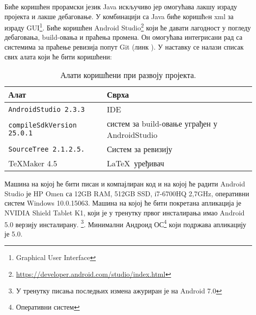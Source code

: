  
Биће коришћен прорамски језик Java искључиво јер омогућава лакшу израду пројекта и лакше дебаговање. У комбинацији са Java биће коришћeн xml за израду GUI\footnote{Graphical User Interface}. Биће коришћен  Android Studio\footnote{\url{https://developer.android.com/studio/index.html}} који ће давати лагодност у погледу дебаговања, build-овања и праћења промена. Он омогућава интегрисани рад са системима за праћење ревизија попут Git (линк \cite{BitBucket}). У наставку се налази списак свих алата који ће бити коришћени:
\begin{table}[H]\centering
\begin{tabular}{ l  l } \toprule
{\bf Алат} & {\bf Сврха}\\ \midrule
{\tt AndroidStudio 2.3.3} & IDE\\
{\tt compileSdkVersion 25.0.1} & систем за build-овање уграђен у AndroidStudio\\
{\tt SourceTree 2.1.2.5.} & Систем за ревизију\\
\TeX Maker 4.5 & \LaTeX\ уређивач\\
\bottomrule
\end{tabular}
\caption{Алати коришћени при развоју пројекта.} \label{UsedTools}
\end{table}
Машина на којој ће бити писан и компајлиран код и на којој ће радити Android Studio је HP Omen са 12GB RAM, 512GB SSD, i7-6700HQ 2,7GHz, оперативни систем Windows 10.0.15063. Машина на којој ће бити покретана апликација је NVIDIA Shield Tablet K1, који је у тренутку првог инсталирања имао Android 5.0 верзију инсталирану. \footnote{У тренутку писања последњих измена ажуриран је на Android 7.0}. Минимални Андроид ОС\footnote{Оперативни систем} који подржава апликацију је 5.0.